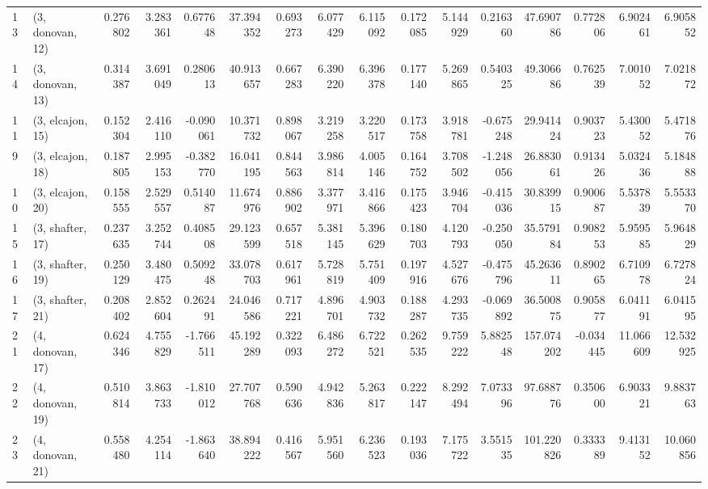 \begin{tabular}{llrrrrrrrrrrrrrr}
13 &  (3, donovan, 12) &   0.276802 &  3.283361 &  0.677648 &  37.394352 &  0.693273 &   6.077429 &  6.115092 &  0.172085 &  5.144929 &  0.216360 &   47.690786 &  0.772806 &   6.902461 &   6.905852 \\
14 &  (3, donovan, 13) &   0.314387 &  3.691049 &  0.280613 &  40.913657 &  0.667283 &   6.390220 &  6.396378 &  0.177140 &  5.269865 &  0.540325 &   49.306686 &  0.762539 &   7.001052 &   7.021872 \\
11 &  (3, elcajon, 15) &   0.152304 &  2.416110 & -0.090061 &  10.371732 &  0.898067 &   3.219258 &  3.220517 &  0.173758 &  3.918781 & -0.675248 &   29.941424 &  0.903723 &   5.430052 &   5.471876 \\
9  &  (3, elcajon, 18) &   0.187805 &  2.995153 & -0.382770 &  16.041195 &  0.844563 &   3.986814 &  4.005146 &  0.164752 &  3.708502 & -1.248056 &   26.883061 &  0.913426 &   5.032436 &   5.184888 \\
10 &  (3, elcajon, 20) &   0.158555 &  2.529557 &  0.514087 &  11.674976 &  0.886902 &   3.377971 &  3.416866 &  0.175423 &  3.946704 & -0.415036 &   30.839915 &  0.900687 &   5.537839 &   5.553370 \\
15 &  (3, shafter, 17) &   0.237635 &  3.252744 &  0.408508 &  29.123599 &  0.657518 &   5.381145 &  5.396629 &  0.180703 &  4.120793 & -0.250050 &   35.579184 &  0.908253 &   5.959585 &   5.964829 \\
16 &  (3, shafter, 19) &   0.250129 &  3.480475 &  0.509248 &  33.078703 &  0.617961 &   5.728819 &  5.751409 &  0.197916 &  4.527676 & -0.475796 &   45.263611 &  0.890265 &   6.710978 &   6.727824 \\
17 &  (3, shafter, 21) &   0.208402 &  2.852604 &  0.262491 &  24.046586 &  0.717221 &   4.896701 &  4.903732 &  0.188287 &  4.293735 & -0.069892 &   36.500875 &  0.905877 &   6.041191 &   6.041595 \\
21 &  (4, donovan, 17) &   0.624346 &  4.755829 & -1.766511 &  45.192289 &  0.322093 &   6.486272 &  6.722521 &  0.262535 &  9.759222 &  5.882548 &  157.074202 & -0.034445 &  11.066609 &  12.532925 \\
22 &  (4, donovan, 19) &   0.510814 &  3.863733 & -1.810012 &  27.707768 &  0.590636 &   4.942836 &  5.263817 &  0.222147 &  8.292494 &  7.073396 &   97.688776 &  0.350600 &   6.903321 &   9.883763 \\
23 &  (4, donovan, 21) &   0.558480 &  4.254114 & -1.863640 &  38.894222 &  0.416567 &   5.951560 &  6.236523 &  0.193036 &  7.175722 &  3.551535 &  101.220826 &  0.333389 &   9.413152 &  10.060856 \\

\end{tabular}
